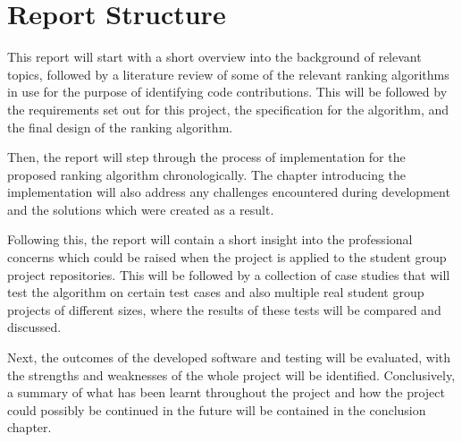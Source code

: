\documentclass[11pt]{informatics-report}
\begin{document}
\section{Report Structure}
This report will start with a short overview into the background of relevant topics, followed by a literature review of some of the relevant ranking algorithms in use for the purpose of identifying code contributions. This will be followed by the requirements set out for this project, the specification for the algorithm, and the final design of the ranking algorithm.

Then, the report will step through the process of implementation for the proposed ranking algorithm chronologically. The chapter introducing the implementation will also address any challenges encountered during development and the solutions which were created as a result. 

Following this, the report will contain a short insight into the professional concerns which could be raised when the project is applied to the student group project repositories. This will be followed by a collection of case studies that will test the algorithm on certain test cases and also multiple real student group projects of different sizes, where the results of these tests will be compared and discussed. 

Next, the outcomes of the developed software and testing will be evaluated, with the strengths and weaknesses of the whole project will be identified. Conclusively, a summary of what has been learnt throughout the project and how the project could possibly be continued in the future will be contained in the conclusion chapter.











\appendix



\end{document}
